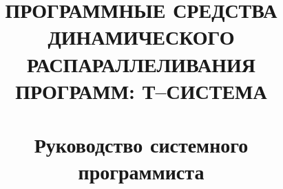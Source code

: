 \documentclass[a4paper,14pt,noinfopart]{uspd}
\title{ПРОГРАММНЫЕ СРЕДСТВА ДИНАМИЧЕСКОГО
РАСПАРАЛЛЕЛИВАНИЯ ПРОГРАММ: Т--СИСТЕМА \\
~\\
Руководство системного программиста}
\begin{document}
\sloppy


\end{document}
